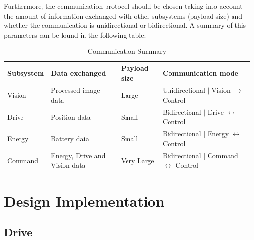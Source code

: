 \documentclass[10pt,twoside]{article}
\begin{document}
Furthermore, the communication protocol should be chosen taking into account the amount of information exchanged with other subsystems (payload size) and whether the communication is unidirectional or bidirectional. A summary of this parameters can be found in the following table:


\begin{table}[hbt]
\centering
\renewcommand{\arraystretch}{1.3}
\begin{tabular}{@{}llll@{}}
\toprule
Subsystem & Data   exchanged                & Payload size & Communication   mode                                       \\ \midrule
Vision    & Processed   image data          & Large        & Unidirectional  $\vert$ Vision $\rightarrow$ Control            \\
Drive     & Position data                   & Small        & Bidirectional  $\vert$ Drive $\leftrightarrow$ Control   \\
Energy    & Battery data                    & Small        & Bidirectional  $\vert$ Energy $\leftrightarrow$ Control  \\
Command   & Energy, Drive   and Vision data & Very Large   & Bidirectional  $\vert$ Command $\leftrightarrow$ Control \\ \bottomrule
\end{tabular}
\caption{Communication Summary}
\end{table}




\newpage

\section{Design Implementation}

\subsection{Drive}
\end{document}
